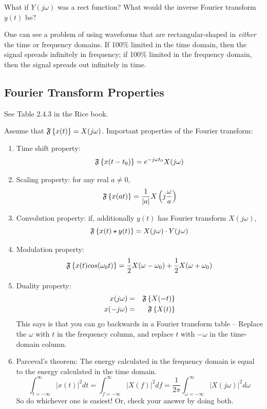 {\Question  What if $Y(j\omega)$ was a rect function?  What would the
inverse Fourier transform $y(t)$ be?

One can see a problem of using waveforms that are rectangular-shaped in \emph{either} the time or frequency domains.  If 100\% limited in the time domain, then the signal spreads infinitely in frequency; if 100\% limited in the frequency domain, then the signal spreads out infinitely in time.

\subsection{Fourier Transform Properties}

See Table 2.4.3 in the Rice book.

Assume that ${\mathfrak{F}\left\{ {x(t)}\right\}} = X(j\omega)$.  Important properties of the
Fourier transform:
\begin{enumerate}
  \item Time shift property:
     \[
       {\mathfrak{F}\left\{ {x(t-t_0)}\right\}} = e^{-j\omega t_0} X(j\omega)
     \]
  \item Scaling property: for any real $a\neq 0$,
     \[
       {\mathfrak{F}\left\{ {x(at)}\right\}} = \frac{1}{|a|} X \left( j\frac{\omega}{a}\right)
     \]
  \item Convolution property: if, additionally $y(t)$ has Fourier
  transform $X(j\omega)$,
     \[
       {\mathfrak{F}\left\{ {x(t) \star y(t)}\right\}} = X(j\omega) \cdot Y(j\omega)
     \]
  \item Modulation property:
     \[
       {\mathfrak{F}\left\{ {x(t) cos(\omega_0 t)}\right\}} = \frac{1}{2}X(\omega-\omega_0)+ \frac{1}{2}X(\omega + \omega_0)
     \]
  \item Duality property:
     \begin{eqnarray}
       x(j\omega) &=& {\mathfrak{F}\left\{ {X(-t)}\right\}} \nonumber \\
       x(-j\omega) &=& {\mathfrak{F}\left\{ {X(t)}\right\}} \nonumber
     \end{eqnarray}
     This says is that you can go backwards in a Fourier transform table -- Replace the $\omega$ with $t$ in the frequency column, and replace $t$ with $-\omega$ in the time-domain column.
  \item Parceval's theorem:  The energy calculated in the frequency
  domain is equal to the energy calculated in the time domain.
     \[
       \int_{t=-\infty}^\infty |x(t)|^2 dt = \int_{f=-\infty}^\infty |X(f)|^2  df = \frac{1}{2\pi}\int_{\omega=-\infty}^\infty |X(j\omega)|^2 d\omega
     \]
     So do whichever one is easiest!  Or, check your answer by doing
     both.
\end{enumerate}

}
